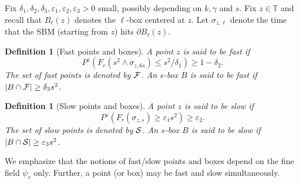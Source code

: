 \documentclass[11pt]{article}
\newtheorem{defn}[theorem]{Definition}
\theoremstyle{definition}
\def \e {\varepsilon}
\def \d {\delta}
\def \ff {{\cal F}}
\def \T {{\mathbb{T}}}
\def \s {\sigma}
\def \ss {{\cal S}}
\begin{document}
Fix
$ \d_1, \d_2, \d_3, \e_1, \e_2, \e_3>0$ small, possibly depending on $k,\gamma$ and $s$.
Fix $z\in \T$ and recall that $B_\ell (z)$ denotes the $\ell$-box centered at $z$.
Let $\s_{z, \ell}$ denote the time that the SBM (starting from $z$) hits $\partial B_\ell (z)$.

\begin{defn}[Fast points and boxes]
  \label{def-fast}
A point $z$ is said to be {\em fast} if
\begin{equation}
  \label{eq-pg7}
  P^z (F_r (s^2 \wedge \s_{z, 6s} ) \le s^2/ \d_1) \ge 1 - \d_2.
\end{equation}
The set of fast points is denoted by $\ff$.
An $s$-box $B$ is said to be {\em fast} if $|B \cap \ff | \ge \d_3 s^2$.
\end{defn}

\begin{defn}[Slow points and boxes]
  \label{def-slow}
A point $z$ is said to be {\em slow} if
\begin{equation}
  \label{eq-pg7a}
  P^z (F_r (\s_{z,s} ) \ge \e_1 s^2 ) \ge \e_2.
\end{equation}
The set of slow points is denoted by
$\ss$. An $s$-box $B$ is said to be {\em slow} if
$|B \cap \ss | \ge \e_3 s^2$.
\end{defn}
We emphasize that the notions of fast/slow points and boxes depend on the
fine field $\psi_r$ only. Further, a point (or box) may be
fast and slow simultaneously.
\end{document}
